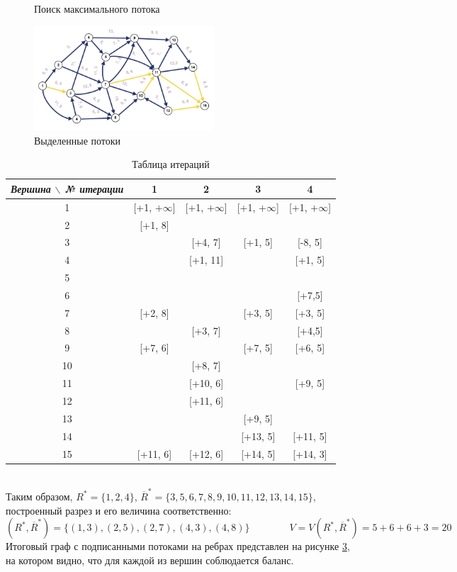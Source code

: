 \documentclass{article}
\begin{document}
\begin{enumerate}
\begin{figure}
\begin{subfigure}[b]{0.45\textwidth}
         \label{fig:18_4}
     \end{subfigure}
        \caption{Поиск максимального потока}
        \label{fig:18_graphs}
\end{figure}
\begin{figure}
    \centering
    \includegraphics[width=0.6\textwidth, center]{attachments/18/18_flows.png}
    \caption{Выделенные потоки}
    \label{fig:18_flows}
\end{figure}
\begin{table}[ht]
    \centering
    \begin{tabular}{|c|c|c|c|c|}
    \hline
        \textit{Вершина $\backslash$ № итерации} & 1 & 2 & 3 & 4 \\ \hline
        1 & [+1, $+\infty$] & [+1, $+\infty$] & [+1, $+\infty$] & [+1, $+\infty$] \\ \hline
        2 & [+1, 8] & ~ & ~ & ~ \\ \hline
        3 & ~ & [+4, 7] & [+1, 5] & [-8, 5] \\ \hline
        4 & ~ & [+1, 11] & ~ & [+1, 5] \\ \hline
        5 & ~ & ~ & ~ & ~ \\ \hline
        6 & ~ & ~ & ~ & [+7,5] \\ \hline
        7 & [+2, 8] & ~ & [+3, 5] & [+3, 5] \\ \hline
        8 & ~ & [+3, 7] & ~ & [+4,5] \\ \hline
        9 & [+7, 6] & ~ & [+7, 5] & [+6, 5] \\ \hline
        10 & ~ & [+8, 7] & ~ & ~ \\ \hline
        11 & ~ & [+10, 6] & ~ & [+9, 5] \\ \hline
        12 & ~ & [+11, 6] & ~ & ~ \\ \hline
        13 & ~ & ~ & [+9, 5] & ~ \\ \hline
        14 & ~ & ~ & [+13, 5] & [+11, 5] \\ \hline
        15 & [+11, 6] & [+12, 6] & [+14, 5] & [+14, 3] \\ \hline
    \end{tabular}
    \caption{Таблица итераций}
    \label{tab:18_table}
\end{table}
\\
Таким образом, $R^* = \{1,2,4\}$, $\overline{R}^* = \{3,5,6,7,8,9,10,11,12,13,14,15\}$, построенный разрез и его величина соответственно:
$$(R^*,\overline{R}^*)=\{(1,3),(2,5),(2,7), (4,3),(4,8)\}\qquad\qquad V=V(R^*,\overline{R}^*)=5+6+6+3=20$$
Итоговый граф с подписанными потоками на ребрах представлен на рисунке \ref{fig:18_flows}, на котором видно, что для каждой из вершин соблюдается баланс.
\end{enumerate}
\end{document}
